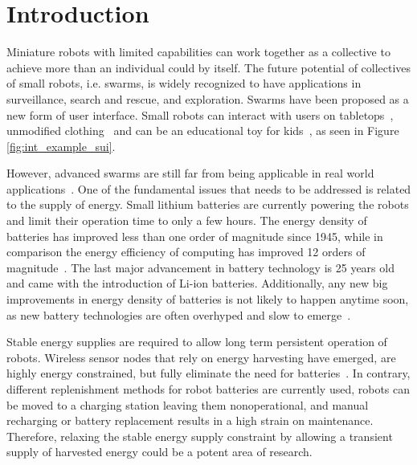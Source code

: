 \chapter{Introduction}
\label{chp:introduction}




Miniature robots with limited capabilities can work together as a collective to achieve more than an individual could by itself.
The future potential of collectives of small robots, i.e. swarms, is widely recognized to have applications in surveillance, search and rescue, and exploration.
Swarms have been proposed as a new form of user interface.
Small robots can interact with users on tabletops~\cite{legoc_uist_2016}, unmodified clothing~\cite{dementyev_uist_2016} and can be an educational toy for kids~\cite{sony_toio_2017}, as seen in Figure \ref{fig:int_example_sui}.


However, advanced swarms are still far from being applicable in real world applications~\cite{barca_sekercioglu_2013}. 
One of the fundamental issues that needs to be addressed is related to the supply of energy.
Small lithium batteries are currently powering the robots and limit their operation time to only a few hours. 
The energy density of batteries has improved less than one order of magnitude since 1945, while in comparison the energy efficiency of computing has improved 12 orders of magnitude~\cite{patel_pvc_2017}.
The last major advancement in battery technology is 25 years old and came with the introduction of Li-ion batteries.
Additionally, any new big improvements in energy density of batteries is not likely to happen anytime soon, as new battery technologies are often overhyped and slow to emerge~\cite{zachary_spec_2016}.



Stable energy supplies are required to allow long term persistent operation of robots.
Wireless sensor nodes that rely on energy harvesting have emerged, are highly energy constrained, but fully eliminate the need for batteries~\cite{wisp5_wiki_2017}.
In contrary, different replenishment methods for robot batteries are currently used, robots can be moved to a charging station leaving them nonoperational, and manual recharging or battery replacement results in a high strain on maintenance.
Therefore, relaxing the stable energy supply constraint by allowing a transient supply of harvested energy could be a potent area of research.

